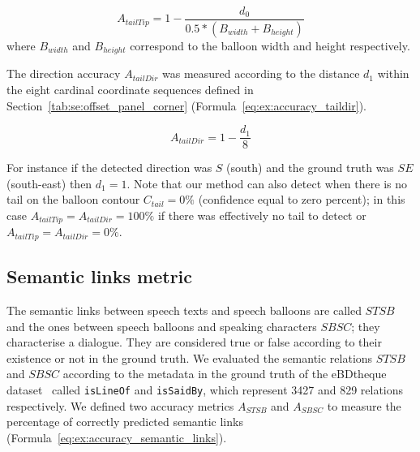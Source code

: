 \begin{equation}
\label{eq:ex:accuracy_tailtip}
  A_{tailTip} = 1 - \frac{d_0}{0.5 * (B_{width} + B_{height})}
\end{equation}
where $B_{width}$ and $B_{height}$ correspond to the balloon width and height respectively.

The direction accuracy $A_{tailDir}$ was measured according to the distance $d_1$ within the eight cardinal coordinate sequences defined in Section~\ref{tab:se:offset_panel_corner} (Formula~\ref{eq:ex:accuracy_taildir}).

\begin{equation}
\label{eq:ex:accuracy_taildir}
  A_{tailDir} = 1 - \frac{d_1}{8}
\end{equation}

For instance if the detected direction was $S$ (south) and the ground truth was $SE$ (south-east) then $d_1=1$.
Note that our method can also detect when there is no tail on the balloon contour $C_{tail}=0\%$ (confidence equal to zero percent); in this case $A_{tailTip}=A_{tailDir}=100\%$ if there was effectively no tail to detect or $A_{tailTip}=A_{tailDir}=0\%$.


\subsection{Semantic links metric} %
\label{sub:ex:semantic_links_metric}

The semantic links between speech texts and speech balloons are called $STSB$ and the ones between speech balloons and speaking characters $SBSC$; they characterise a dialogue.
They are considered true or false according to their existence or not in the ground truth.
We evaluated the semantic relations $STSB$ and $SBSC$ according to the metadata in the ground truth of the eBDtheque dataset~\cite{Guerin2013} called \texttt{{isLineOf}} and \texttt{{isSaidBy}}, which represent 3427 and 829 relations respectively.
We defined two accuracy metrics $A_{STSB}$ and $A_{SBSC}$ to measure the percentage of correctly predicted semantic links (Formula~\ref{eq:ex:accuracy_semantic_links}).

